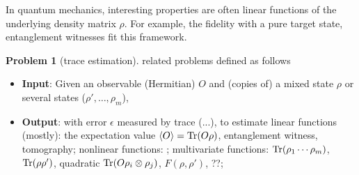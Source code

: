 \documentclass[
reprint,
aps,
pra,
]{revtex4-2}
\theoremstyle{plain}
\theoremstyle{definition}
\newtheorem{problem}{Problem}
\newcommand{\ob}{O}
\newcommand{\dm}{\rho}
\begin{document}
In quantum mechanics, interesting properties are often linear functions of the underlying density matrix $\dm$.
For example, the fidelity with a pure target state, entanglement witnesses fit this framework.
\begin{problem}[trace estimation]\label{prm:trace_estimation}
	related problems defined as follows
	\begin{itemize}
		\item \textbf{Input}: Given an observable (Hermitian) $\ob$ and (copies of) a mixed state $\dm$ or several states ($\dm',\dots,\dm_m$), 
		\item \textbf{Output}: 
		with error $\epsilon$ measured by trace  (...), to estimate
		linear functions (mostly): the expectation value $\expval{\ob}=\Tr(\ob \dm) $, entanglement witness, tomography; 
		nonlinear functions: ;
		multivariate functions:  $\Tr(\dm_1 \cdots \dm_m)$,  $\Tr(\dm\dm')$,  quadratic $\Tr(\ob \dm_i \otimes \dm_j)$,  $F(\dm,\dm')$, ??;
	\end{itemize}
\end{problem}
\end{document}

